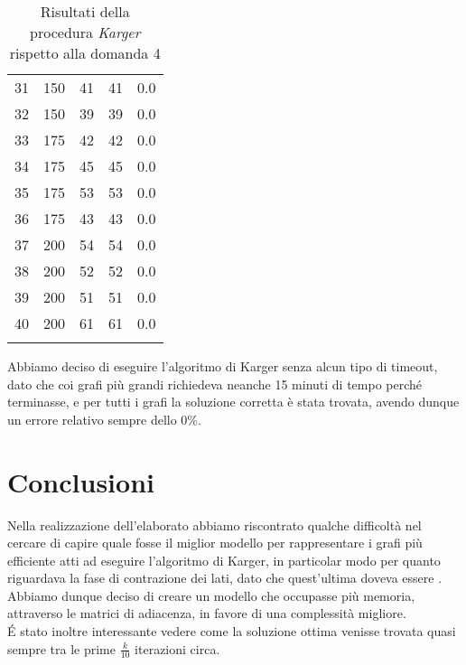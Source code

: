 \begin{center}
\begin{longtable}{|c|c|c|c|c|}
		31 & 150 & 41 & 41 & 0.0 \\
		32 & 150 & 39 & 39 & 0.0 \\
		33 & 175 & 42 & 42 & 0.0 \\
		34 & 175 & 45 & 45 & 0.0 \\
		35 & 175 & 53 & 53 & 0.0 \\
		36 & 175 & 43 & 43 & 0.0 \\
		37 & 200 & 54 & 54 & 0.0 \\
		38 & 200 & 52 & 52 & 0.0 \\
		39 & 200 & 51 & 51 & 0.0 \\
		40 & 200 & 61 & 61 & 0.0 \\
		\hline
		\caption{Risultati della procedura \textit{Karger} rispetto alla domanda 4}
		\label{error-results}
	\end{longtable}
\end{center}\vspace{-40pt}

Abbiamo deciso di eseguire l'algoritmo di Karger senza alcun tipo di timeout, dato che coi grafi più grandi richiedeva neanche 15 minuti di tempo perché terminasse, e per tutti i grafi la soluzione corretta è stata trovata, avendo dunque un errore relativo sempre dello 0\%.

\section{Conclusioni}
Nella realizzazione dell'elaborato abbiamo riscontrato qualche difficoltà nel cercare di capire quale fosse il miglior modello per rappresentare i grafi più efficiente atti ad eseguire l'algoritmo di Karger, in particolar modo per quanto riguardava la fase di contrazione dei lati, dato che quest'ultima doveva essere . Abbiamo dunque deciso di creare un modello che occupasse più memoria, attraverso le matrici di adiacenza, in favore di una complessità migliore.\\
\'E stato inoltre interessante vedere come la soluzione ottima venisse trovata quasi sempre tra le prime $\frac{k}{10}$ iterazioni circa.